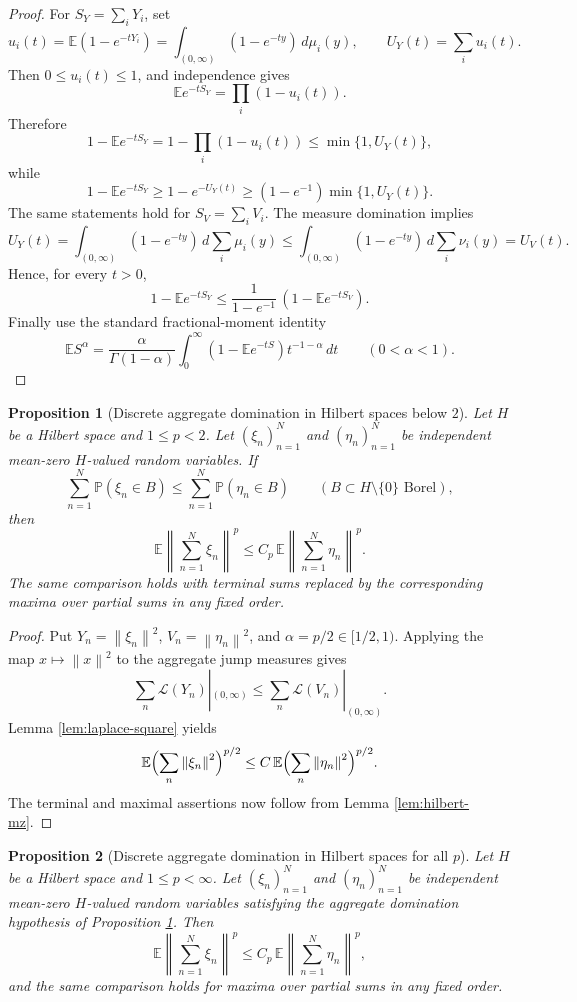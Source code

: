 \documentclass[11pt]{article}
\newtheorem{proposition}{Proposition}
\newcommand{\E}{\mathbb E}
\newcommand{\Pp}{\mathbb P}
\newcommand{\norm}[1]{\left\lVert #1\right\rVert}
\begin{document}
\begin{proof}
For \(S_Y=\sum_iY_i\), set
\[
   u_i(t)=\E(1-e^{-tY_i})
          =\int_{(0,\infty)}(1-e^{-ty})\,d\mu_i(y),
   \qquad
   U_Y(t)=\sum_i u_i(t).
\]
Then \(0\leq u_i(t)\leq1\), and independence gives
\[
   \E e^{-tS_Y}=\prod_i(1-u_i(t)).
\]
Therefore
\[
   1-\E e^{-tS_Y}
   =
   1-\prod_i(1-u_i(t))
   \leq
   \min\{1,U_Y(t)\},
\]
while
\[
   1-\E e^{-tS_Y}
   \geq
   1-e^{-U_Y(t)}
   \geq
   (1-e^{-1})\min\{1,U_Y(t)\}.
\]
The same statements hold for \(S_V=\sum_iV_i\).  The measure domination implies
\[
   U_Y(t)
   =
   \int_{(0,\infty)}(1-e^{-ty})\,d\sum_i\mu_i(y)
   \leq
   \int_{(0,\infty)}(1-e^{-ty})\,d\sum_i\nu_i(y)
   =
   U_V(t).
\]
Hence, for every \(t>0\),
\[
   1-\E e^{-tS_Y}
   \leq
   \frac{1}{1-e^{-1}}\,(1-\E e^{-tS_V}).
\]
Finally use the standard fractional-moment identity
\[
   \E S^\alpha
   =
   \frac{\alpha}{\Gamma(1-\alpha)}
   \int_0^\infty (1-\E e^{-tS})t^{-1-\alpha}\,dt
   \qquad(0<\alpha<1).
\]
\end{proof}

\begin{proposition}[Discrete aggregate domination in Hilbert spaces below \(2\)]
\label{prop:discrete-hilbert-low}
Let \(H\) be a Hilbert space and \(1\leq p<2\).  Let
\((\xi_n)_{n=1}^N\) and \((\eta_n)_{n=1}^N\) be independent mean-zero
\(H\)-valued random variables.  If
\[
   \sum_{n=1}^N \Pp(\xi_n\in B)
   \leq
   \sum_{n=1}^N \Pp(\eta_n\in B)
   \qquad
   (B\subset H\setminus\{0\}\text{ Borel}),
\]
then
\[
   \E\norm{\sum_{n=1}^N \xi_n}^p
   \leq
   C_p\,\E\norm{\sum_{n=1}^N \eta_n}^p .
\]
The same comparison holds with terminal sums replaced by the corresponding
maxima over partial sums in any fixed order.
\end{proposition}

\begin{proof}
Put \(Y_n=\norm{\xi_n}^2\), \(V_n=\norm{\eta_n}^2\), and
\(\alpha=p/2\in[1/2,1)\).  Applying the map \(x\mapsto\norm{x}^2\) to the
aggregate jump measures gives
\[
   \sum_n \mathcal L(Y_n)|_{(0,\infty)}
   \leq
   \sum_n \mathcal L(V_n)|_{(0,\infty)} .
\]
Lemma \ref{lem:laplace-square} yields
\[
   \E\Bigl(\sum_n\norm{\xi_n}^2\Bigr)^{p/2}
   \leq
   C\,\E\Bigl(\sum_n\norm{\eta_n}^2\Bigr)^{p/2}.
\]
The terminal and maximal assertions now follow from Lemma
\ref{lem:hilbert-mz}.
\end{proof}

\begin{proposition}[Discrete aggregate domination in Hilbert spaces for all \(p\)]
\label{prop:discrete-hilbert-all}
Let \(H\) be a Hilbert space and \(1\leq p<\infty\).  Let
\((\xi_n)_{n=1}^N\) and \((\eta_n)_{n=1}^N\) be independent mean-zero
\(H\)-valued random variables satisfying the aggregate domination hypothesis
of Proposition \ref{prop:discrete-hilbert-low}.  Then
\[
   \E\norm{\sum_{n=1}^N \xi_n}^p
   \leq
   C_p\,\E\norm{\sum_{n=1}^N \eta_n}^p ,
\]
and the same comparison holds for maxima over partial sums in any fixed order.
\end{proposition}
\end{document}
